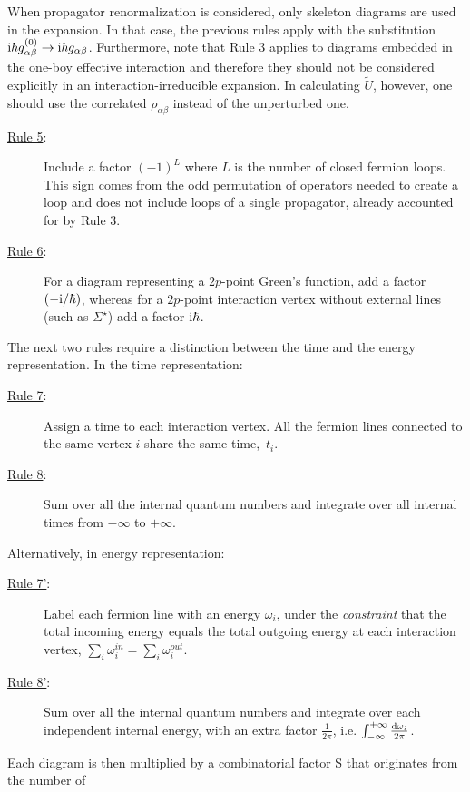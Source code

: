 When propagator renormalization is considered, only skeleton diagrams are used in the 
expansion. In that case, the previous rules apply with the substitution 
${\rm i} \hbar g_{\alpha\beta}^{(0)} \to 
{\rm i} \hbar g_{\alpha\beta}$.
Furthermore, note that  Rule 3 applies to diagrams embedded 
in the one-boy effective interaction 
 and therefore they should not be considered explicitly in
an interaction-irreducible expansion. 
In calculating $\widetilde U$, however, 
one should use the correlated $\rho_{\alpha\beta}$ instead of the unperturbed one. 
\begin{description}
\item[\underline{Rule 5}:] Include a factor $(-1)^{L}$ where $L$ is the number of closed fermion loops. This sign comes from the odd permutation of  operators needed to create a loop
and does not include loops of a single propagator, already accounted for by Rule 3.
\item[\underline{Rule 6}:] For a diagram representing a $2p$-point Green's function, add a factor $(-{\rm i}/\hbar)$, whereas for a $2p$-point interaction vertex without external lines (such as $\Sigma^\star$) add a factor ${\rm i}\hbar$.
\end{description}
The next two rules require a distinction between the time and the energy representation. 
In the time representation:
\begin{description}
\item[\underline{Rule 7}:] Assign a time to each interaction vertex. All the fermion lines connected to the same vertex $i$ share the same time,~$t_i$. 
\item[\underline{Rule 8}:] Sum over all the internal quantum numbers and integrate over all internal times from $-\infty$ to $+\infty$. 
\end{description}
Alternatively, in energy representation:
\begin{description}
\item[\underline{Rule 7'}:]  Label each fermion line with an energy $\omega_i$, 
under the \emph{constraint} that the total incoming energy equals the total outgoing energy at 
each interaction vertex, \hbox{$\sum_i\omega_i^{in}=\sum_i\omega_i^{out}$}.
\item[\underline{Rule 8'}:] Sum over all the internal quantum numbers and integrate over each independent internal energy, with an extra factor $\frac{1}{2\pi}$, i.e. $\int^{+\infty}_{-\infty} \frac{{\rm d}\omega_i}{2\pi}$.
\end{description}
Each diagram is then multiplied by a combinatorial factor S that  originates from the number of 
